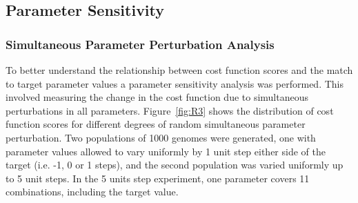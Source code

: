 \subsection{Parameter Sensitivity}

% 
% 
% 
% 
% 
% 
% 
% 

\subsubsection{Simultaneous Parameter Perturbation Analysis}

To better understand the relationship between cost function scores and the match
to target parameter values a parameter sensitivity analysis was performed. This
involved measuring the change in the cost function due to simultaneous
perturbations in all parameters.  Figure~\ref{fig:R3} shows the distribution of
cost function scores for different degrees of random simultaneous parameter
perturbation. Two populations of 1000 genomes were generated, one with parameter
values allowed to vary uniformly by 1 unit step either side of the target
(i.e. -1, 0 or 1 steps), and the second population was varied uniformly up to 5
unit steps.  In the 5 units step experiment, one parameter covers 11
combinations, including the target value.


